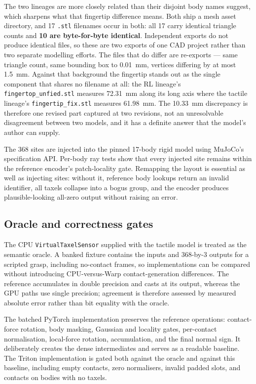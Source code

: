\documentclass[journal]{IEEEtran}
\begin{document}
The two lineages are more closely related than their disjoint body names suggest, which sharpens what that fingertip difference means. Both ship a mesh asset directory, and 17 \texttt{.stl} filenames occur in both: all 17 carry identical triangle counts and \textbf{10 are byte-for-byte identical}. Independent exports do not produce identical files, so these are two exports of one CAD project rather than two separate modelling efforts. The files that do differ are re-exports --- same triangle count, same bounding box to 0.01~mm, vertices differing by at most 1.5~mm. Against that background the fingertip stands out as the single component that shares no filename at all: the RL lineage's \texttt{fingertop\_unfied.stl} measures 72.31~mm along its long axis where the tactile lineage's \texttt{fingertip\_fix.stl} measures 61.98~mm. The 10.33~mm discrepancy is therefore one revised part captured at two revisions, not an unresolvable disagreement between two models, and it has a definite answer that the model's author can supply.

The 368 sites are injected into the pinned 17-body rigid model using MuJoCo's specification API. Per-body ray tests show that every injected site remains within the reference encoder's patch-locality gate. Remapping the layout is essential as well as injecting sites: without it, reference body lookups return an invalid identifier, all taxels collapse into a bogus group, and the encoder produces plausible-looking all-zero output without raising an error.

\subsection{Oracle and correctness gates}

The CPU \texttt{VirtualTaxelSensor} supplied with the tactile model is treated as the semantic oracle. A banked fixture contains the inputs and 368-by-3 outputs for a scripted grasp, including no-contact frames, so implementations can be compared without introducing CPU-versus-Warp contact-generation differences. The reference accumulates in double precision and casts at its output, whereas the GPU paths use single precision; agreement is therefore assessed by measured absolute error rather than bit equality with the oracle.

The batched PyTorch implementation preserves the reference operations: contact-force rotation, body masking, Gaussian and locality gates, per-contact normalisation, local-force rotation, accumulation, and the final normal sign. It deliberately creates the dense intermediates and serves as a readable baseline. The Triton implementation is gated both against the oracle and against this baseline, including empty contacts, zero normalisers, invalid padded slots, and contacts on bodies with no taxels.
\end{document}
